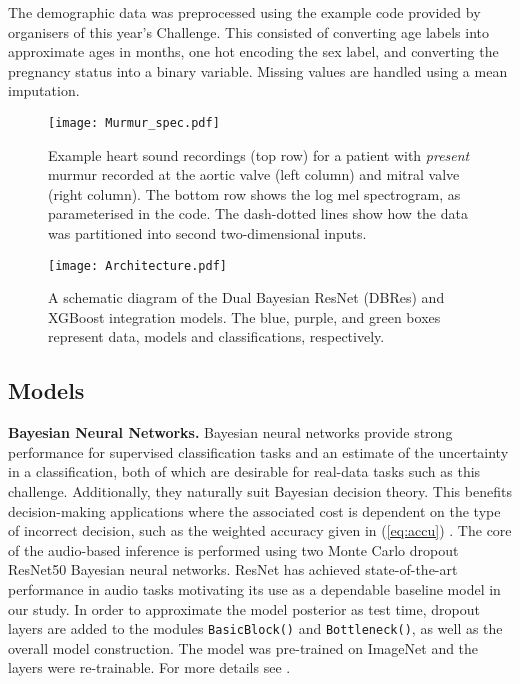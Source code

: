 \documentclass[twocolumn]{cinc}
\begin{document}
The demographic data was preprocessed using the example code provided by organisers of this year's Challenge. This consisted of converting age labels into approximate ages in months, one hot encoding the sex label, and converting the pregnancy status into a binary variable. Missing values are handled using a mean imputation.

\begin{figure}[htbp]
\texttt{[image: Murmur\_spec.pdf]}
\caption{Example heart sound recordings (top row) for a patient with \textit{present} murmur recorded at the aortic valve (left column) and mitral valve (right column). The bottom row shows the log mel spectrogram, as parameterised in the code. The dash-dotted lines show how the data was partitioned into  second two-dimensional inputs.}
\label{fig:mel_spec}
\end{figure}





\begin{figure}[htbp]
\texttt{[image: Architecture.pdf]}
\caption{A schematic diagram of the Dual Bayesian ResNet (DBRes) and XGBoost integration models. The blue, purple, and green boxes represent data, models and classifications, respectively.}
\label{fig:architecture}
\end{figure}



\subsection{Models} {\bf Bayesian Neural Networks.} Bayesian neural networks provide strong performance for supervised classification tasks and an estimate of the uncertainty in a classification, both of which are desirable for real-data tasks such as this challenge. Additionally, they naturally suit Bayesian decision theory. This benefits decision-making applications where the associated cost is dependent on the type of incorrect decision, such as the weighted accuracy given in (\ref{eq:accu}) \cite{cobb2018loss}. The core of the audio-based inference is performed using two
Monte Carlo dropout ResNet50 Bayesian neural networks. ResNet has achieved state-of-the-art performance in audio tasks \cite{palanisamy2020rethinking} motivating its use as a dependable baseline model in our study. In order to approximate the model posterior as test time, dropout layers are added to the modules \texttt{BasicBlock()} and \texttt{Bottleneck()}, as well as the overall model construction. The model was pre-trained on ImageNet and the layers were re-trainable. For more details see \cite[Appendix B.4]{kiskin2021humbugdb}.
\end{document}
